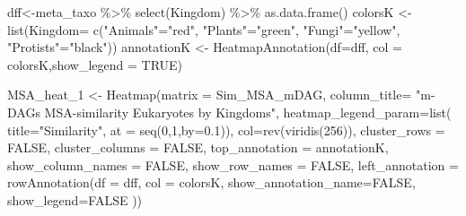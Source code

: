 \documentclass[
  letterpaper,
  DIV=11,
  numbers=noendperiod]{scrreprt}
\newenvironment{Shaded}{}{}
\newcommand{\AttributeTok}[1]{\textcolor[rgb]{0.78,0.47,0.87}{#1}}
\newcommand{\ConstantTok}[1]{\textcolor[rgb]{0.82,0.60,0.40}{#1}}
\newcommand{\DecValTok}[1]{\textcolor[rgb]{0.82,0.60,0.40}{#1}}
\newcommand{\FloatTok}[1]{\textcolor[rgb]{0.82,0.60,0.40}{#1}}
\newcommand{\FunctionTok}[1]{\textcolor[rgb]{0.38,0.69,0.94}{#1}}
\newcommand{\NormalTok}[1]{\textcolor[rgb]{0.67,0.70,0.75}{#1}}
\newcommand{\OtherTok}[1]{\textcolor[rgb]{0.15,0.68,0.38}{#1}}
\newcommand{\SpecialCharTok}[1]{\textcolor[rgb]{0.34,0.71,0.76}{#1}}
\newcommand{\StringTok}[1]{\textcolor[rgb]{0.60,0.76,0.47}{#1}}
\begin{document}
\begin{Shaded}
\begin{Highlighting}[]
\NormalTok{dff}\OtherTok{\textless{}{-}}\NormalTok{meta\_taxo }\SpecialCharTok{\%\textgreater{}\%} \FunctionTok{select}\NormalTok{(Kingdom)  }\SpecialCharTok{\%\textgreater{}\%} \FunctionTok{as.data.frame}\NormalTok{()}
\NormalTok{colorsK }\OtherTok{\textless{}{-}} \FunctionTok{list}\NormalTok{(}\AttributeTok{Kingdom=} \FunctionTok{c}\NormalTok{(}\StringTok{"Animals"}\OtherTok{=}\StringTok{"red"}\NormalTok{,}
                           \StringTok{"Plants"}\OtherTok{=}\StringTok{"green"}\NormalTok{,}
                           \StringTok{"Fungi"}\OtherTok{=}\StringTok{"yellow"}\NormalTok{,}
                           \StringTok{"Protists"}\OtherTok{=}\StringTok{"black"}\NormalTok{))}
\NormalTok{annotationK }\OtherTok{\textless{}{-}} \FunctionTok{HeatmapAnnotation}\NormalTok{(}\AttributeTok{df=}\NormalTok{dff, }\AttributeTok{col =}\NormalTok{ colorsK,}\AttributeTok{show\_legend =} \ConstantTok{TRUE}\NormalTok{)}

\NormalTok{MSA\_heat\_1 }\OtherTok{\textless{}{-}} \FunctionTok{Heatmap}\NormalTok{(}\AttributeTok{matrix =}\NormalTok{ Sim\_MSA\_mDAG, }
                      \AttributeTok{column\_title=}
                        \StringTok{"m{-}DAGs MSA{-}similarity Eukaryotes by Kingdoms"}\NormalTok{,}
                      \AttributeTok{heatmap\_legend\_param=}\FunctionTok{list}\NormalTok{(}
                        \AttributeTok{title=}\StringTok{"Similarity"}\NormalTok{,}
                        \AttributeTok{at =} \FunctionTok{seq}\NormalTok{(}\DecValTok{0}\NormalTok{,}\DecValTok{1}\NormalTok{,}\AttributeTok{by=}\FloatTok{0.1}\NormalTok{)),}
                      \AttributeTok{col=}\FunctionTok{rev}\NormalTok{(}\FunctionTok{viridis}\NormalTok{(}\DecValTok{256}\NormalTok{)),}
                      \AttributeTok{cluster\_rows =} \ConstantTok{FALSE}\NormalTok{,}
                      \AttributeTok{cluster\_columns =} \ConstantTok{FALSE}\NormalTok{,}
                      \AttributeTok{top\_annotation =}\NormalTok{ annotationK,}
                      \AttributeTok{show\_column\_names =} \ConstantTok{FALSE}\NormalTok{, }
                      \AttributeTok{show\_row\_names =} \ConstantTok{FALSE}\NormalTok{,}
                      \AttributeTok{left\_annotation =}
                        \FunctionTok{rowAnnotation}\NormalTok{(}\AttributeTok{df =}\NormalTok{ dff,}
                                      \AttributeTok{col =}\NormalTok{ colorsK,}
                                    \AttributeTok{show\_annotation\_name=}\ConstantTok{FALSE}\NormalTok{,}
                                    \AttributeTok{show\_legend=}\ConstantTok{FALSE}
\NormalTok{                                      ))}








\end{Highlighting}
\end{Shaded}
\end{document}
